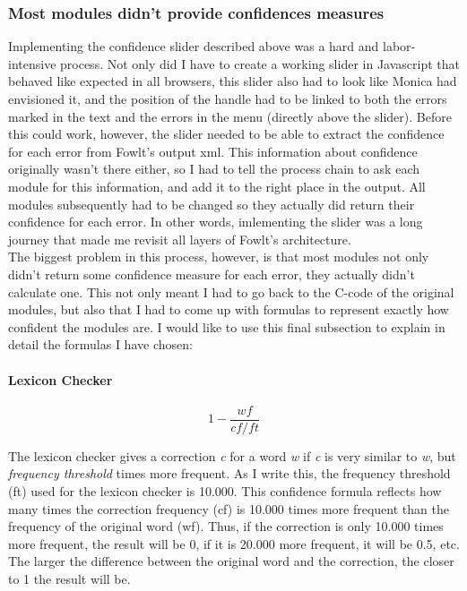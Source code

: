 \documentclass[12pt]{article}
\begin{document}
\subsubsection{Most modules didn't provide confidences measures} \label{formulas}
Implementing the confidence slider described above was a hard and labor-intensive process. Not only did I have to create a working slider in Javascript that behaved like expected in all browsers, this slider also had to look like Monica had envisioned it, and the position of the handle had to be linked to both the errors marked in the text and the errors in the menu (directly above the slider). Before this could work, however, the slider needed to be able to extract the confidence for each error from Fowlt's output xml. This information about confidence originally wasn't there either, so I had to tell the process chain to ask each module for this information, and add it to the right place in the output. All modules subsequently had to be changed so they actually did return their confidence for each error. In other words, imlementing the slider was a long journey that made me revisit all layers of Fowlt's architecture.\\\indent
The biggest problem in this process, however, is that most modules not only didn't return some confidence measure for each error, they actually didn't calculate one. This not only meant I had to go back to the C-code of the original modules, but also that I had to come up with formulas to represent exactly how confident the modules are. I would like to use this final subsection to explain in detail the formulas I have chosen:

\paragraph{Lexicon Checker}

\[
1 - \frac{wf}{cf/ft}
\]

The lexicon checker gives a correction \emph{c} for a word \emph{w} if \emph{c} is very similar to \emph{w}, but \emph{frequency threshold} times more frequent. As I write this, the frequency threshold (ft) used for the lexicon checker is 10.000. This confidence formula reflects how many times the correction frequency (cf) is 10.000 times more frequent than the frequency of the original word (wf). Thus, if the correction is only 10.000 times more frequent, the result will be 0, if it is 20.000 more frequent, it will be 0.5, etc. The larger the difference between the original word and the correction, the closer to 1 the result will be.
\end{document}
